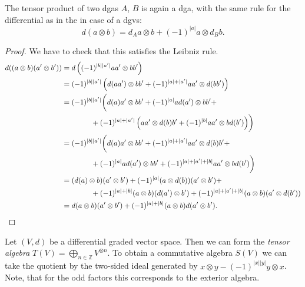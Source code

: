 \documentclass[english,no-theorem-numbers]{short-notes}
\newcommand\degree[1]{|#1|}
\begin{document}
\begin{Prop}
The tensor product of two dgas $A$, $B$ is again a dga, with the same rule for the differential as in the in case of a dgvs:
\[
d(a \otimes b) = d_Aa \otimes b + (-1)^{\degree a} a \otimes d_B b.
\]
\end{Prop}
\begin{proof}
    We have to check that this satisfies the Leibniz rule.
    \begin{align*}
    d( (a \otimes b)(a'\otimes b')) & =
    d\left(  (-1)^{\degree b \degree{a'}} aa' \otimes bb' \right) \\ & =
    (-1)^{\degree b \degree{a'}} \left( d(aa') \otimes bb' + (-1)^{\degree a + \degree{a'}} aa' \otimes d(bb') \right) \\ & =
    (-1)^{\degree b \degree{a'}} \biggl( d(a)a' \otimes bb' + (-1)^{\degree a} ad(a') \otimes bb' + \\
        &\qquad\qquad + (-1)^{\degree a + \degree{a'}} \left( aa' \otimes d(b)b' + (-1)^{\degree b} aa' \otimes bd(b') \right) \biggr) \\ & =
    (-1)^{\degree b \degree{a'}} \biggl( d(a)a' \otimes bb' + (-1)^{\degree a + \degree{a'}} aa' \otimes d(b)b' + \\
        &\qquad\qquad + (-1)^{\degree a} ad(a') \otimes bb' + (-1)^{\degree a + \degree{a'} + \degree b}aa' \otimes bd(b') \biggr)\\ & =
    (d(a) \otimes b)(a' \otimes b') + (-1)^{\degree a}(a \otimes d(b))(a' \otimes b') + \\
        &\qquad\qquad + (-1)^{\degree a + \degree b} (a \otimes b)(d(a') \otimes b') + (-1)^{\degree a + \degree{a'} + \degree b} (a \otimes b)(a' \otimes d(b')) \\ & =
    d(a \otimes b)(a' \otimes b') + (-1)^{\degree a + \degree b}(a \otimes b)d(a' \otimes b').
    \qedhere
\end{align*}%
\end{proof}%

\begin{Ex}
    Let $(V,d)$ be a differential graded vector space.
    Then we can form the \emph{tensor algebra} $T(V) = \bigoplus_{n ∈ ℤ} V^{\otimes n}$.
    To obtain a commutative algebra $S(V)$ we can take the quotient by the two-sided ideal generated by $x \otimes y - (-1)^{\degree x \degree y} y \otimes x$.
    Note, that for the odd factors this corresponds to the exterior algebra.
\end{Ex}
\end{document}

